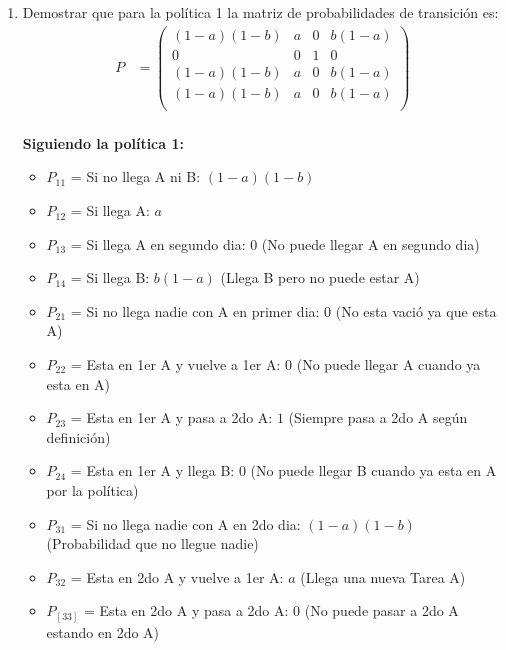 \documentclass{templateNote}
\begin{document}
\begin{enumerate}[start = 2]
    \begin{enumerate}[label = \alph*)]
        \item Demostrar que para la política 1 la matriz de probabilidades de transición es:
        \begin{align*}
            P &= \left(
                \begin{array}{cccc}    
                    (1-a)(1-b)  & a & 0 & b(1-a)\\
                    0           & 0 & 1 & 0     \\
                    (1-a)(1-b)  & a & 0 & b(1-a)\\
                    (1-a)(1-b)  & a & 0 & b(1-a)\\
                \end{array}
                \right)\\
        \end{align*}
        \begin{center}
            \textbf{Siguiendo la política 1:}
            \begin{itemize}
                \item $P_{11}$ = Si no llega A ni B: $(1-a)(1-b)$
                \item $P_{12}$ = Si llega A: $a$
                \item $P_{13}$ = Si llega A en segundo dia: $0$ (No puede llegar A en segundo dia)
                \item $P_{14}$ = Si llega B: $b(1-a)$ (Llega B pero no puede estar A)
                \item $P_{21}$ = Si no llega nadie con A en primer dia: $0$ (No esta vació ya que esta A)
                \item $P_{22}$ = Esta en 1er A y vuelve a 1er A: $0$ (No puede llegar A cuando ya esta en A)
                \item $P_{23}$ = Esta en 1er A y pasa a 2do A: $1$ (Siempre pasa a 2do A según definición)
                \item $P_{24}$ = Esta en 1er A y llega B: $0$ (No puede llegar B cuando ya esta en A por la política)
                \item $P_{31}$ = Si no llega nadie con A en 2do dia: $(1-a)(1-b)$ (Probabilidad que no llegue nadie)
                \item $P_{32}$ = Esta en 2do A y vuelve a 1er A: $a$ (Llega una nueva Tarea A)
                \item $P_[33]$ = Esta en 2do A y pasa a 2do A: $0$ (No puede pasar a 2do A estando en 2do A)

\end{itemize}
\end{center}
\end{enumerate}
\end{enumerate}
\end{document}
